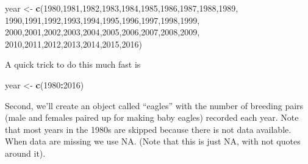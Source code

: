 \documentclass[]{book}
\newenvironment{Shaded}{\begin{snugshade}}{\end{snugshade}}
\newcommand{\KeywordTok}[1]{\textcolor[rgb]{0.13,0.29,0.53}{\textbf{#1}}}
\newcommand{\DecValTok}[1]{\textcolor[rgb]{0.00,0.00,0.81}{#1}}
\newcommand{\StringTok}[1]{\textcolor[rgb]{0.31,0.60,0.02}{#1}}
\newcommand{\OperatorTok}[1]{\textcolor[rgb]{0.81,0.36,0.00}{\textbf{#1}}}
\newcommand{\NormalTok}[1]{#1}
\theoremstyle{definition}
\theoremstyle{definition}
\theoremstyle{definition}
\theoremstyle{remark}
\begin{document}
\begin{Shaded}
\begin{Highlighting}[]
\NormalTok{year <-}\StringTok{ }\KeywordTok{c}\NormalTok{(}\DecValTok{1980}\NormalTok{,}\DecValTok{1981}\NormalTok{,}\DecValTok{1982}\NormalTok{,}\DecValTok{1983}\NormalTok{,}\DecValTok{1984}\NormalTok{,}\DecValTok{1985}\NormalTok{,}\DecValTok{1986}\NormalTok{,}\DecValTok{1987}\NormalTok{,}\DecValTok{1988}\NormalTok{,}\DecValTok{1989}\NormalTok{,}
          \DecValTok{1990}\NormalTok{,}\DecValTok{1991}\NormalTok{,}\DecValTok{1992}\NormalTok{,}\DecValTok{1993}\NormalTok{,}\DecValTok{1994}\NormalTok{,}\DecValTok{1995}\NormalTok{,}\DecValTok{1996}\NormalTok{,}\DecValTok{1997}\NormalTok{,}\DecValTok{1998}\NormalTok{,}\DecValTok{1999}\NormalTok{,}
          \DecValTok{2000}\NormalTok{,}\DecValTok{2001}\NormalTok{,}\DecValTok{2002}\NormalTok{,}\DecValTok{2003}\NormalTok{,}\DecValTok{2004}\NormalTok{,}\DecValTok{2005}\NormalTok{,}\DecValTok{2006}\NormalTok{,}\DecValTok{2007}\NormalTok{,}\DecValTok{2008}\NormalTok{,}\DecValTok{2009}\NormalTok{,}
          \DecValTok{2010}\NormalTok{,}\DecValTok{2011}\NormalTok{,}\DecValTok{2012}\NormalTok{,}\DecValTok{2013}\NormalTok{,}\DecValTok{2014}\NormalTok{,}\DecValTok{2015}\NormalTok{,}\DecValTok{2016}\NormalTok{)}
\end{Highlighting}
\end{Shaded}

A quick trick to do this much fast is

\begin{Shaded}
\begin{Highlighting}[]
\NormalTok{year <-}\StringTok{ }\KeywordTok{c}\NormalTok{(}\DecValTok{1980}\OperatorTok{:}\DecValTok{2016}\NormalTok{)}
\end{Highlighting}
\end{Shaded}

Second, we'll create an object called ``eagles'' with the number of
breeding pairs (male and females paired up for making baby eagles)
recorded each year. Note that most years in the 1980s are skipped
because there is not data available. When data are missing we use NA.
(Note that this is just NA, with not quotes around it).
\end{document}
